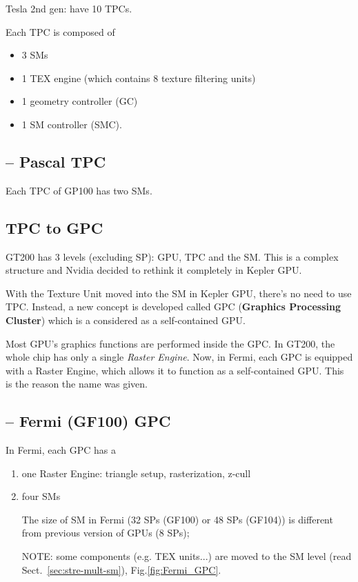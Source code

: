 Tesla 2nd gen: have 10 TPCs.

Each TPC is composed of
  \begin{itemize}
  \item 3 SMs 

  \item 1 TEX engine (which contains 8
    texture filtering units)
    
  \item 1 geometry controller (GC) 
  
  \item 1 SM controller (SMC). 
\end{itemize}

\subsection{-- Pascal TPC}
\label{sec:TPC-Pascal}


Each TPC of GP100 has two SMs.



\subsection{TPC to GPC}
\label{sec:tpc-gpc}
\label{sec:GPC}

GT200 has 3 levels (excluding SP): GPU, TPC and the SM. This is a complex
structure and Nvidia decided to rethink it completely in Kepler GPU. 

With the Texture Unit moved into the SM in Kepler GPU, there's no need to use
TPC. Instead, a new concept is developed called GPC ({\bf Graphics Processing
Cluster}) which is a considered as a self-contained GPU.

Most GPU's graphics functions are performed inside the GPC. In GT200, the whole
chip has only a single {\it Raster Engine}. Now, in Fermi, each GPC is equipped
with a Raster Engine, which allows it to function as a self-contained GPU.  This
is the reason the name was given.

\subsection{-- Fermi (GF100) GPC}
    
In Fermi, each GPC has a 
\begin{enumerate}
  \item one Raster Engine: triangle setup, rasterization, z-cull
  \item four SMs
  
The size of SM in Fermi (32 SPs (GF100) or 48 SPs (GF104)) is different from
previous version of GPUs (8 SPs); 

NOTE: some components (e.g. TEX units...) are moved to the SM level (read
Sect.~\ref{sec:stre-mult-sm}), Fig.\ref{fig:Fermi_GPC}.

\end{enumerate}


